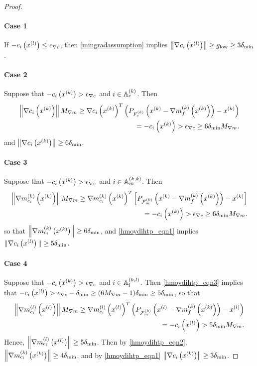 \begin{proof}
\paragraph*{Case 1}
If $-c_i\left({x^{(l)}}\right) \le {\epsilon_{\nabla c}}$, then \cref{mingradassumption} implies $\left\| \nabla c_i\left({x^{(l)}}\right) \right\| \ge { g_{\textrm{low}} } \ge 3 {\delta_{\textrm{min}}}$.

\paragraph*{Case 2}
Suppose that $-c_i\left(x^{(k)}\right) > {\epsilon_{\nabla c}}$ and $i \in {\mathbb A_c^{(k)}}$.
Then
\begin{align*}
\left\|\nabla c_i\left(x^{(k)}\right)  \right\| {M_{\nabla m}}
\ge \nabla c_i\left(x^{(k)}\right) ^T\left(P_{{F_c^{(k)}}}\left(x^{(k)} - {\nabla m_f^{(k)}\left(x^{(k)}\right)}\right) - x^{(k)}\right) \\
= -c_i\left(x^{(k)}\right) > {\epsilon_{\nabla c}} \ge 6 {\delta_{\textrm{min}}} {M_{\nabla m}}.
\end{align*}
and $\left\|\nabla c_i\left(x^{(k)}\right)  \right\| \ge 6 {\delta_{\textrm{min}}}$.


\paragraph*{Case 3}
Suppose that $-c_i\left(x^{(k)}\right) > {\epsilon_{\nabla c}}$ and $i \in {\mathbb A_m^{(k, k)}}$.
Then
\begin{align*}
\left\|{\nabla m_{c_i}^{(k)}\left(x^{(k)}\right)}\right\| {M_{\nabla m}}
\ge {\nabla m_{c_i}^{(k)}\left(x^{(k)}\right)}^T\left[P_{{\mathcal F_m^{(k)}}}\left(x^{(k)} - {\nabla m_f^{(k)}\left(x^{(k)}\right)}\right) - x^{(k)}\right] \\
= -c_i\left(x^{(k)}\right) > {\epsilon_{\nabla c}} \ge 6 {\delta_{\textrm{min}}} {M_{\nabla m}}.
\end{align*}
so that $\left\|{\nabla m_{c_i}^{(k)}\left(x^{(k)}\right)}\right\| \ge 6 {\delta_{\textrm{min}}}$, and \cref{hmoydihtp_eqn1} implies $\| \nabla c_i\left({x^{(l)}}\right) \| \ge 5 {\delta_{\textrm{min}}}$.

\paragraph*{Case 4}
Suppose that $-c_i\left(x^{(k)}\right) > {\epsilon_{\nabla c}}$ and $i \in {\mathbb A_l^{(k, l)}}$.
Then \cref{hmoydihtp_eqn3} implies that $-c_i\left({x^{(l)}}\right) > {\epsilon_{\nabla c}} - {\delta_{\textrm{min}}} \ge (6{M_{\nabla m}} - 1) {\delta_{\textrm{min}}} \ge 5 {\delta_{\textrm{min}}}$, so that
\begin{align*}
\left\|{\nabla m_{c_i}^{(l)}\left({x^{(l)}}\right)}\right\| {M_{\nabla m}}
\ge {\nabla m_{c_i}^{(l)}\left({x^{(l)}}\right)}^T\left(P_{{\mathcal F_m^{(k)}}}\left({x^{(l)}} - {\nabla m_f^{(k)}\left(x^{(k)}\right)}\right) - {x^{(l)}}\right) \\
= -c_i\left({x^{(l)}}\right) > 5 {\delta_{\textrm{min}}} {M_{\nabla m}}.
\end{align*}
Hence, $\left\|{\nabla m_{c_i}^{(l)}\left({x^{(l)}}\right)}\right\| \ge 5 {\delta_{\textrm{min}}}$.
Then by \cref{hmoydihtp_eqn2}, $\left\|{\nabla m_{c_i}^{(k)}\left(x^{(k)}\right)}\right\| \ge 4 {\delta_{\textrm{min}}}$, and by \cref{hmoydihtp_eqn1} $\left\|\nabla c_i\left(x^{(k)}\right) \right\| \ge 3 {\delta_{\textrm{min}}}$.



\end{proof}
